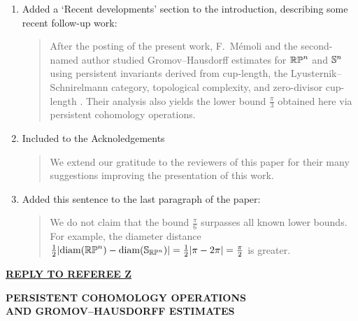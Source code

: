 \documentclass{amsart}
\begin{document}
	\begin{enumerate}
		\item Added a `Recent developments' section to the introduction, describing some recent follow-up work:
		\medskip
		\begin{quote}
			After the posting of the present work, F.~M\'emoli and the second-named author studied Gromov--Hausdorff estimates for \(\mathbb{RP}^n\) and \(\mathbb{S}^n\) using persistent invariants derived from cup-length, the Lyusternik--Schnirelmann category, topological complexity, and zero-divisor cup-length \cite{memoli2025persistence}.
			Their analysis also yields the lower bound \(\frac{\pi}{3}\) obtained here via persistent cohomology operations.
		\end{quote}

		\item Included to the Acknoledgements
		\medskip
		\begin{quote}
			We extend our gratitude to the reviewers of this paper for their many suggestions improving the presentation of this work.
		\end{quote}

		\item Added this sentence to the last paragraph of the paper:
		\medskip
		\begin{quote}
			We do not claim that the bound \(\frac{\pi}{6}\) surpasses all known lower bounds.
			For example, the diameter distance \(\frac{1}{2} \lvert \operatorname{diam}(\mathbb{RP}^n) - \operatorname{diam}(\mathbb{S}_{\mathbb{RP}^n}) \rvert = \frac{1}{2} \lvert \pi - 2\pi \rvert = \frac{\pi}{2}\) is greater.
		\end{quote}
	\end{enumerate}

    
    \newpage



    \begin{center}
        {\large\bfseries\underline{REPLY TO REFEREE Z}\par}
        \medskip
        {\bfseries PERSISTENT COHOMOLOGY OPERATIONS \\ 
        AND GROMOV--HAUSDORFF ESTIMATES\par}
        \medskip
    \end{center}
\end{document}
